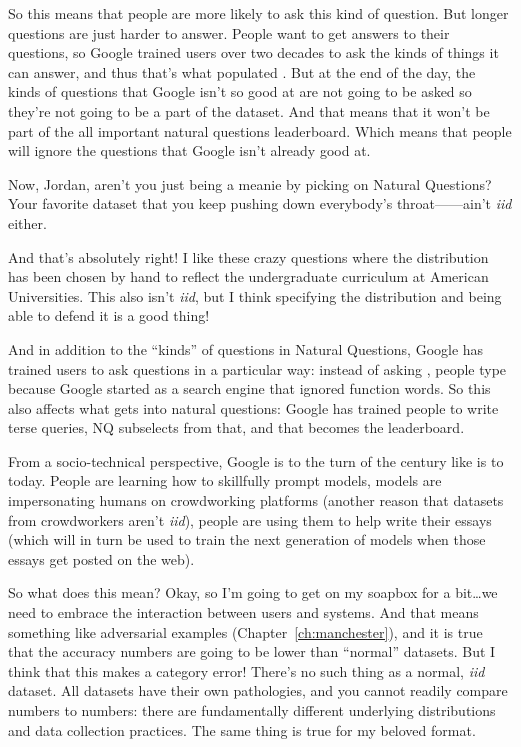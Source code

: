 So this means that people are more likely to ask this kind of
question.
%
But longer questions are just harder to answer.  
%
People want to get answers to their questions, so Google trained users
over two decades to ask the kinds of things it can answer, and thus
that's what populated .
%
But at the end of the day, the kinds of questions that Google isn’t so
good at are not going to be asked so they’re not going to be a part of
the dataset.
%
And that means that it won’t be part of the all important natural
questions leaderboard.  Which means that people will ignore the
questions that Google isn’t already good at.

Now, Jordan, aren’t you just being a meanie by picking on Natural
Questions?
%
Your favorite  dataset that you keep pushing down everybody’s
throat—\quizbowl{}—ain’t \textit{iid} either.

And that’s absolutely right!  I like these crazy \quizbowl{} questions
where the distribution has been chosen by hand to reflect the
undergraduate curriculum at American Universities.
%
This also isn’t \textit{iid}, but I think specifying the distribution
and being able to defend it is a good thing!

And in addition to the ``kinds'' of questions in Natural Questions,
Google has trained users to ask questions in a particular way: instead
of asking , people type
 because Google started as a search engine
that ignored function words.  So this also affects what gets into
natural questions: Google has trained people to write terse queries,
NQ subselects from that, and that becomes the leaderboard.

From a socio-technical perspective, Google is to the turn of the
century like  is  to today.
%
People are learning how to skillfully prompt models, models are
impersonating humans on crowdworking platforms (another reason that
datasets from crowdworkers aren’t \textit{iid}), people are using them to help
write their essays (which will in turn be used to train the next
generation of models when those essays get posted on the web).

So what does this mean?  
%
Okay, so I’m going to get on my soapbox for a bit\dots we need to embrace
the interaction between users and systems.
%
And that means something like adversarial examples
(Chapter~\ref{ch:manchester}), and it is true that the accuracy
numbers are going to be lower than ``normal'' datasets.
%
But I think that this makes a category error!  There’s no such thing
as a normal, \textit{iid} dataset.
%
All datasets have their own pathologies, and you cannot readily
compare \squad{} numbers to  numbers: there are fundamentally
different underlying distributions and data collection practices.
%
The same thing is true for my beloved \quizbowl{} format.

